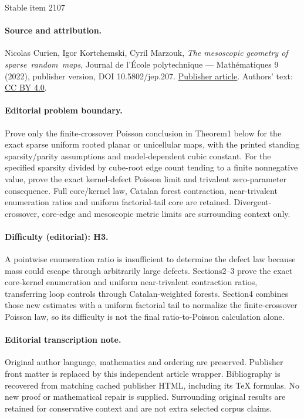 \documentclass[11pt]{article}
\theoremstyle{plain}
\theoremstyle{definition}
\theoremstyle{remark}
\begin{document}
\begin{center}{\Large Stable item 2107}\end{center}
\paragraph{Source and attribution.}
Nicolas Curien, Igor Kortchemski, Cyril Marzouk, \emph{The mesoscopic geometry of sparse random maps}, Journal de l’École polytechnique — Mathématiques 9 (2022), publisher version, DOI 10.5802/jep.207. \href{https://jep.centre-mersenne.org/articles/10.5802/jep.207/}{Publisher article}. Authors' text: \href{https://creativecommons.org/licenses/by/4.0/}{CC BY 4.0}.
\paragraph{Editorial problem boundary.}
Prove only the finite-crossover Poisson conclusion in Theorem1 below for the exact sparse uniform rooted planar or unicellular maps, with the printed standing sparsity/parity assumptions and model-dependent cubic constant. For the specified sparsity divided by cube-root edge count tending to a finite nonnegative value, prove the exact kernel-defect Poisson limit and trivalent zero-parameter consequence. Full core/kernel law, Catalan forest contraction, near-trivalent enumeration ratios and uniform factorial-tail core are retained. Divergent-crossover, core-edge and mesoscopic metric limits are surrounding context only.
\paragraph{Difficulty (editorial): H3.}
A pointwise enumeration ratio is insufficient to determine the defect law because mass could escape through arbitrarily large defects. Sections2–3 prove the exact core-kernel enumeration and uniform near-trivalent contraction ratios, transferring loop controls through Catalan-weighted forests. Section4 combines those new estimates with a uniform factorial tail to normalize the finite-crossover Poisson law, so its difficulty is not the final ratio-to-Poisson calculation alone.
\paragraph{Editorial transcription note.}
Original author language, mathematics and ordering are preserved. Publisher front matter is replaced by this independent article wrapper. Bibliography is recovered from matching cached publisher HTML, including its TeX formulas. No new proof or mathematical repair is supplied. Surrounding original results are retained for conservative context and are not extra selected corpus claims.
\clearpage
\end{document}
